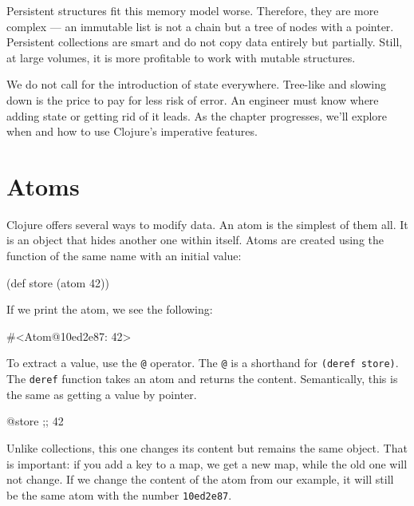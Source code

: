 Persistent structures fit this memory model worse.
Therefore, they are more complex — an immutable list is not a chain but a tree of nodes with a pointer.
Persistent collections are smart and do not copy data entirely but partially.
Still, at large volumes, it is more profitable to work with mutable structures.

We do not call for the introduction of state everywhere.
Tree-like and slowing down is the price to pay for less risk of error.
An engineer must know where adding state or getting rid of it leads.
As the chapter progresses, we'll explore when and how to use Clojure's imperative features.

\section{Atoms}


Clojure offers several ways to modify data.
An atom is the simplest of them all. It is an object that hides another one within itself.
Atoms are created using the function of the same name with an initial value:

\begin{english}
  \begin{clojure}
(def store (atom 42))
  \end{clojure}
\end{english}

If we print the atom, we see the following:

\begin{english}
  \begin{clojure}
#<Atom@10ed2e87: 42>
  \end{clojure}
\end{english}

To extract a value, use the \verb|@| operator.
The \verb|@| is a shorthand for \verb|(deref store)|.
The \verb|deref| function takes an atom and returns the content.
Semantically, this is the same as getting a value 
by pointer.


\begin{english}
  \begin{clojure}
@store ;; 42
  \end{clojure}
\end{english}

Unlike collections, this one changes its content but remains the same object.
That is important: if you add a key to a map, we get a new map, while the old one will not change.
If we change the content of the atom from our example, it will still be the same atom with the number \verb|10ed2e87|.

